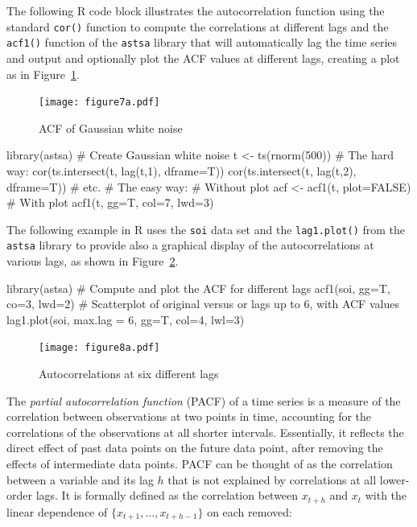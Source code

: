 The following R code block illustrates the autocorrelation function using the standard \texttt{cor()} function to compute the correlations at different lags and the \texttt{acf1()} function of the \texttt{astsa} library that will automatically lag the time series and output and optionally plot the ACF values at different lags, creating a plot as in Figure~\ref{fig:figure7a}.

\begin{figure}
\centering
\texttt{[image: figure7a.pdf]}
\caption{ACF of Gaussian white noise}
\label{fig:figure7a}
\end{figure}

\begin{samepage}
\begin{Rcode}
library(astsa)
# Create Gaussian white noise
t <- ts(rnorm(500))
# The hard way:
cor(ts.intersect(t, lag(t,1), dframe=T))
cor(ts.intersect(t, lag(t,2), dframe=T))
# etc.
# The easy way:
# Without plot
acf <- acf1(t, plot=FALSE)
# With plot
acf1(t, gg=T, col=7, lwd=3)
\end{Rcode}
\end{samepage}

The following example in R uses the \texttt{soi} data set and the \texttt{lag1.plot()} from the \texttt{astsa} library to provide also a graphical display of the autocorrelations at various lags, as shown in Figure~\ref{fig:figure8a}.

\begin{samepage}
\begin{Rcode}
library(astsa)
# Compute and plot the ACF for different lags
acf1(soi, gg=T, co=3, lwd=2)
# Scatterplot of original versus or lags up to 6, with ACF values
lag1.plot(soi, max.lag = 6, gg=T, col=4, lwl=3)
\end{Rcode}
\end{samepage}

\begin{figure}
\centering
\texttt{[image: figure8a.pdf]}
\caption{Autocorrelations at six different lags}
\label{fig:figure8a}
\end{figure}

The \emph{partial autocorrelation function} (PACF) of a time series is a measure of the correlation between observations at two points in time, accounting for the correlations of the observations at all shorter intervals. Essentially, it reflects the direct effect of past data points on the future data point, after removing the effects of intermediate data points. PACF can be thought of as the correlation between a variable and its lag $h$ that is not explained by correlations at all lower-order lags. It is formally defined as the correlation between $x_{t+h}$ and $x_t$ with the linear dependence of $\{x_{t+1}, \ldots, x_{t+h-1}\}$ on each removed:

